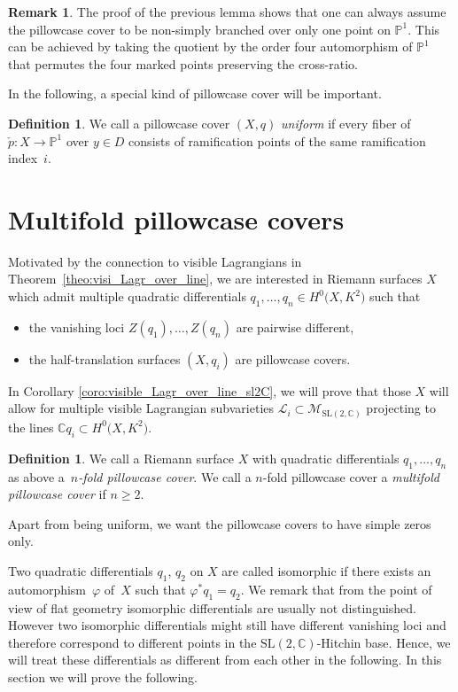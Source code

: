 \documentclass[10pt,a4paper]{amsart}
\numberwithin{equation}{section}
\theoremstyle{definition}
\newtheorem{defi}[theo]{Definition}
\newtheorem{rema}[theo]{Remark}
\renewcommand{\to}{\rightarrow}
\newcommand{\calL}{\mathcal{L}}
\newcommand{\calM}{\mathcal{M}}
\newcommand{\CC}{\mathbb{C}}
\newcommand{\PP}{\mathbb{P}}
\newcommand{\SL}{\mathrm{SL}}
\begin{document}
\begin{rema}
 The proof of the previous lemma shows that one can always assume the pillowcase cover to be non-simply branched over only one point on $\PP^1$. This can be achieved by taking the quotient by the order four automorphism of $\PP^1$ that permutes the four marked points preserving the cross-ratio.
\end{rema}

In the following, a special kind of pillowcase cover will be important.
\begin{defi}\label{defi:uniform_pillow_cover}
	We call a pillowcase cover $(X,q)$ \emph{uniform} if every fiber of $\check{p}\colon X \to \PP^1$ over $y \in D$ consists of ramification points of the same ramification index~$i$.
\end{defi}

\section{Multifold pillowcase covers} \label{sec:pill-sever-ways}

Motivated by the connection to visible Lagrangians in Theorem~\ref{theo:visi_Lagr_over_line}, we are interested in Riemann surfaces $X$ which admit multiple quadratic differentials $q_1,\dots,q_n \in H^0\bigl(X,K^{2}\bigr)$ such that
\begin{itemize}\itemsep=0pt
	\item the vanishing loci $Z(q_1), \dots, Z(q_n)$ are pairwise different,
	\item the half-translation surfaces $(X, q_i)$ are pillowcase covers.
 \end{itemize}
In Corollary \ref{coro:visible_Lagr_over_line_sl2C}, we will prove that those $X$ will allow for multiple visible Lagrangian subvarieties $\calL_i \subset \calM_{\SL(2,\CC)}$ projecting to the lines $\CC q_i \subset H^0\bigl(X,K^{2}\bigr)$.
\begin{defi}
	We call a Riemann surface $X$ with quadratic differentials $q_1,\dots,q_n$ as above a~\emph{$n$-fold pillowcase cover}.
	We call a $n$-fold pillowcase cover a \emph{multifold pillowcase cover} if $n \geq 2$.
\end{defi}

Apart from being uniform, we want the pillowcase covers to have simple zeros only.

Two quadratic differentials $q_1$, $q_2$ on $X$ are called isomorphic if there exists an automorphism~$\varphi$ of~$X$ such that $\varphi^* q_1 = q_2$.
We remark that from the point of view of flat geometry isomorphic differentials are usually not distinguished.
However two isomorphic differentials might still have different vanishing loci and therefore correspond to different points in the $\SL(2,\CC)$-Hitchin base. Hence, we will treat these differentials as different from each other in the following.
In this section we will prove the following.
\end{document}
